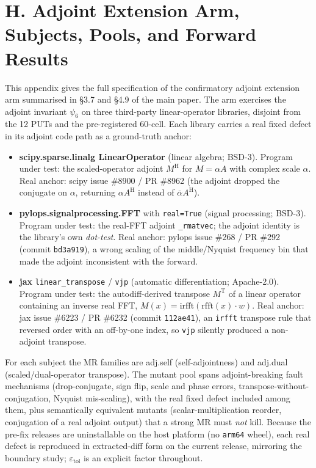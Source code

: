 \documentclass[acmsmall,screen,review]{acmart}
\providecommand{\tightlist}{\setlength{\itemsep}{0pt}\setlength{\parskip}{0pt}}
\begin{document}
\section{H. Adjoint Extension Arm, Subjects, Pools, and Forward
Results}\label{h.-adjoint-extension-arm}

This appendix gives the full specification of the confirmatory adjoint
extension arm summarised in §3.7 and §4.9 of the main paper. The arm
exercises the adjoint invariant $\psi_6$ on three third-party
linear-operator libraries, disjoint from the 12 PUTs and the
pre-registered 60-cell. Each library carries a real fixed defect in its
adjoint code path as a ground-truth anchor:

\begin{itemize}
\tightlist
\item
  \textbf{scipy.sparse.linalg LinearOperator} (linear algebra; BSD-3).
  Program under test: the scaled-operator adjoint $M^{\mathrm{H}}$ for
  $M = \alpha A$ with complex scale $\alpha$. Real anchor: scipy issue
  \#8900 / PR \#8962 (the adjoint dropped the conjugate on $\alpha$,
  returning $\alpha A^{\mathrm{H}}$ instead of $\bar{\alpha}
  A^{\mathrm{H}}$).
\item
  \textbf{pylops.signalprocessing.FFT} with \texttt{real=True} (signal
  processing; BSD-3). Program under test: the real-FFT adjoint
  \texttt{\_rmatvec}; the adjoint identity is the library's own
  \emph{dot-test}. Real anchor: pylops issue \#268 / PR \#292 (commit
  \texttt{bd3a919}), a wrong scaling of the middle/Nyquist frequency bin
  that made the adjoint inconsistent with the forward.
\item
  \textbf{jax} \texttt{linear\_transpose} / \texttt{vjp} (automatic
  differentiation; Apache-2.0). Program under test: the autodiff-derived
  transpose $M^{\mathrm{T}}$ of a linear operator containing an inverse
  real FFT, $M(x) = \mathrm{irfft}(\mathrm{rfft}(x)\cdot w)$. Real anchor:
  jax issue \#6223 / PR \#6232 (commit \texttt{112ae41}), an
  \texttt{irfft} transpose rule that reversed order with an off-by-one
  index, so \texttt{vjp} silently produced a non-adjoint transpose.
\end{itemize}

For each subject the MR families are adj.self (self-adjointness) and
adj.dual (scaled/dual-operator transpose). The mutant pool spans
adjoint-breaking fault mechanisms (drop-conjugate, sign flip, scale and
phase errors, transpose-without-conjugation, Nyquist mis-scaling), with
the real fixed defect included among them, plus semantically equivalent
mutants (scalar-multiplication reorder, conjugation of a real adjoint
output) that a strong MR must \emph{not} kill. Because the pre-fix
releases are uninstallable on the host platform (no \texttt{arm64} wheel),
each real defect is reproduced in extracted-diff form on the current
release, mirroring the boundary study; $\varepsilon_{\mathrm{tol}}$ is an
explicit factor throughout.
\end{document}
